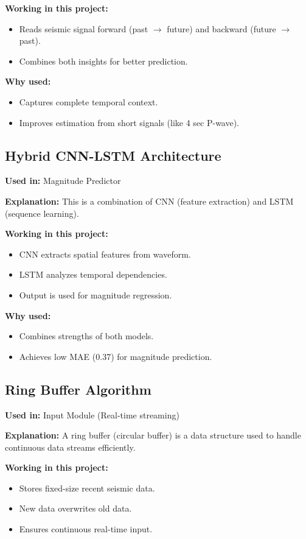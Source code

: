 \documentclass[a4paper,12pt]{report}
\begin{document}
\textbf{Working in this project:}
\begin{itemize}
\item Reads seismic signal forward (past $\rightarrow$ future) and backward (future $\rightarrow$ past).
\item Combines both insights for better prediction.
\end{itemize}

\textbf{Why used:}
\begin{itemize}
\item Captures complete temporal context.
\item Improves estimation from short signals (like 4 sec P-wave).
\end{itemize}

\subsection{Hybrid CNN-LSTM Architecture}
\textbf{Used in:} Magnitude Predictor

\textbf{Explanation:} This is a combination of CNN (feature extraction) and LSTM (sequence learning).

\textbf{Working in this project:}
\begin{itemize}
\item CNN extracts spatial features from waveform.
\item LSTM analyzes temporal dependencies.
\item Output is used for magnitude regression.
\end{itemize}

\textbf{Why used:}
\begin{itemize}
\item Combines strengths of both models.
\item Achieves low MAE (0.37) for magnitude prediction.
\end{itemize}

\subsection{Ring Buffer Algorithm}
\textbf{Used in:} Input Module (Real-time streaming)

\textbf{Explanation:} A ring buffer (circular buffer) is a data structure used to handle continuous data streams efficiently.

\textbf{Working in this project:}
\begin{itemize}
\item Stores fixed-size recent seismic data.
\item New data overwrites old data.
\item Ensures continuous real-time input.
\end{itemize}
\end{document}
